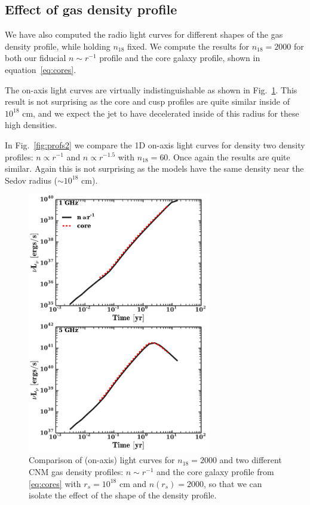 \documentclass[usenatbib,fleqn]{mnras}
\begin{document}


\subsection{Effect of gas density profile}
\label{sec:profileComp}
We have also computed the radio light curves for different shapes of
the gas density profile, while holding $n_{18}$ fixed. We compute the
results for $n_{18}=2000$ for both our fiducial $n\sim r^{-1}$ profile and
the core galaxy profile, shown in equation~\eqref{eq:cores}. 

The on-axis light curves are virtually indistinguishable as shown in
Fig.~\ref{fig:cores}. This result is not surprising as
the core and cusp profiles are quite similar inside of $10^{18}$ cm,
and we expect the jet to have decelerated inside of this radius for
these high densities. 

In Fig.~\ref{fig:profs2} we compare the 1D on-axis light curves for
density two density profiles: $n\propto r^{-1}$ and $n\propto r^{-1.5}$
with $n_{18}=60$. Once again the results are quite similar. Again this
is not surprising as the models have the same density near the Sedov
radius ($\sim 10^{18}$ cm).  


\begin{figure} 
  \includegraphics[width=8cm]{fig_cores.pdf}
  \caption{\label{fig:cores} Comparison of (on-axis) light curves for
    $n_{18}=2000$ and two different CNM gas density profiles: $n\sim
    r^{-1}$ and the core galaxy profile from \eqref{eq:cores} with
    $r_s=10^{18}$ cm and $n(r_s)=2000$, so that we can isolate the
    effect of the shape of the density profile.}
\end{figure}
\end{document}
